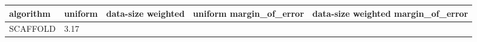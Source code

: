 \begin{tabular}{lllll}
\toprule
algorithm & uniform & data-size weighted & uniform margin_of_error & data-size weighted margin_of_error \\
\midrule
SCAFFOLD & 3.17%
\bottomrule
\end{tabular}
